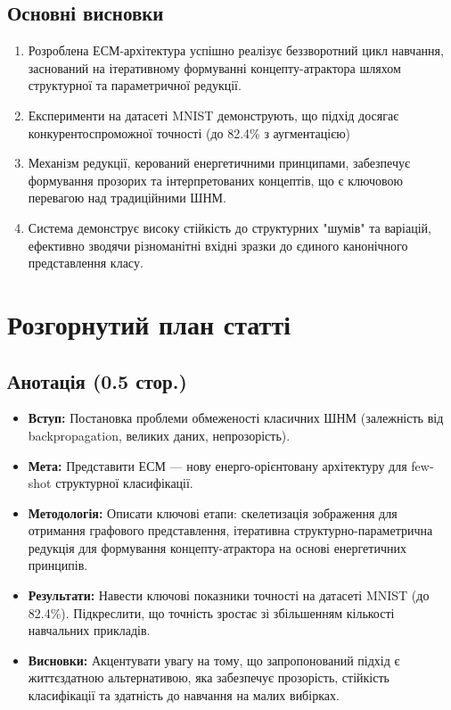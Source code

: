 \documentclass[12pt, a4paper]{article}
\begin{document}
\subsection*{Основні висновки}
\begin{enumerate}
    \item Розроблена ЕСМ-архітектура успішно реалізує беззворотний цикл навчання, заснований на ітеративному формуванні концепту-атрактора шляхом структурної та параметричної редукції.
    \item Експерименти на датасеті MNIST демонструють, що підхід досягає конкурентоспроможної точності (до 82.4\% з аугментацією)
    \item Механізм редукції, керований енергетичними принципами, забезпечує формування прозорих та інтерпретованих концептів, що є ключовою перевагою над традиційними ШНМ.
    \item Система демонструє високу стійкість до структурних "шумів" та варіацій, ефективно зводячи різноманітні вхідні зразки до єдиного канонічного представлення класу.
\end{enumerate}

\newpage

\section*{Розгорнутий план статті}

\subsection*{Анотація (0.5 стор.)}
\begin{itemize}
    \item \textbf{Вступ:} Постановка проблеми обмеженості класичних ШНМ (залежність від backpropagation, великих даних, непрозорість).
    \item \textbf{Мета:} Представити ЕСМ — нову енерго-орієнтовану архітектуру для few-shot структурної класифікації.
    \item \textbf{Методологія:} Описати ключові етапи: скелетизація зображення для отримання графового представлення, ітеративна структурно-параметрична редукція для формування концепту-атрактора на основі енергетичних принципів.
    \item \textbf{Результати:} Навести ключові показники точності на датасеті MNIST (до 82.4\%). Підкреслити, що точність зростає зі збільшенням кількості навчальних прикладів.
    \item \textbf{Висновки:} Акцентувати увагу на тому, що запропонований підхід є життєздатною альтернативою, яка забезпечує прозорість, стійкість класифікації та здатність до навчання на малих вибірках.
\end{itemize}
\end{document}
